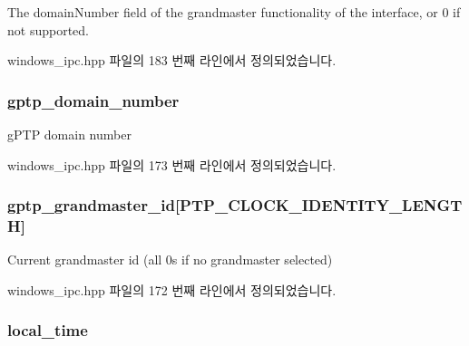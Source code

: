 The domain\+Number field of the grandmaster functionality of the interface, or 0 if not supported. 



windows\+\_\+ipc.\+hpp 파일의 183 번째 라인에서 정의되었습니다.

\subsubsection[{\texorpdfstring{gptp\+\_\+domain\+\_\+number}{gptp_domain_number}}]{ gptp\+\_\+domain\+\_\+number\hspace{0.3cm}{\ttfamily [inherited]}}\hypertarget{class_offset_ac53b4e61c0f960e16c86cfe678ca256d}{}\label{class_offset_ac53b4e61c0f960e16c86cfe678ca256d}


g\+P\+TP domain number 



windows\+\_\+ipc.\+hpp 파일의 173 번째 라인에서 정의되었습니다.

\subsubsection[{\texorpdfstring{gptp\+\_\+grandmaster\+\_\+id}{gptp_grandmaster_id}}]{ gptp\+\_\+grandmaster\+\_\+id\mbox{[}{\bf P\+T\+P\+\_\+\+C\+L\+O\+C\+K\+\_\+\+I\+D\+E\+N\+T\+I\+T\+Y\+\_\+\+L\+E\+N\+G\+TH}\mbox{]}\hspace{0.3cm}{\ttfamily [inherited]}}\hypertarget{class_offset_a3545e41943aa3080a0817fb8a49fd34c}{}\label{class_offset_a3545e41943aa3080a0817fb8a49fd34c}


Current grandmaster id (all 0\textquotesingle{}s if no grandmaster selected) 



windows\+\_\+ipc.\+hpp 파일의 172 번째 라인에서 정의되었습니다.

\subsubsection[{\texorpdfstring{local\+\_\+time}{local_time}}]{ local\+\_\+time\hspace{0.3cm}{\ttfamily [inherited]}}\hypertarget{class_offset_a77a3c33b68032d5db3c0c556a80ef651}{}\label{class_offset_a77a3c33b68032d5db3c0c556a80ef651}


